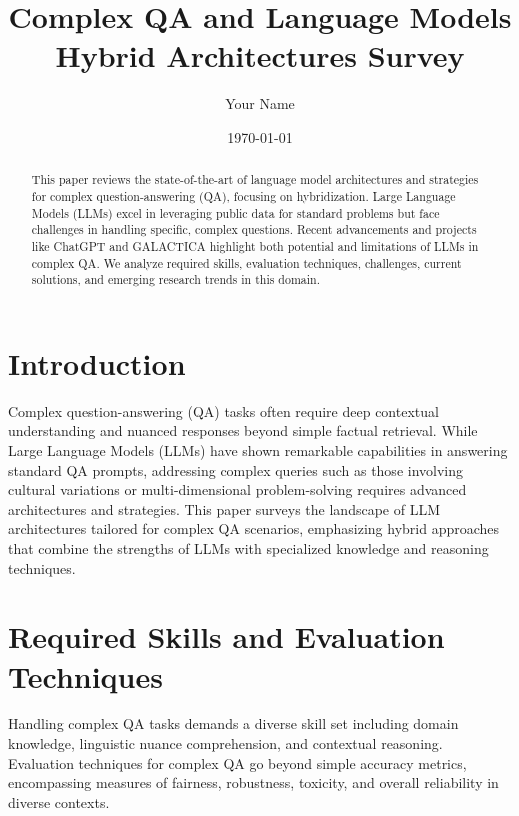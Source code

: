 \documentclass{article}
\title{Complex QA and Language Models Hybrid Architectures Survey}
\author{Your Name}
\date{\today}
\begin{document}
\maketitle

\begin{abstract}
    This paper reviews the state-of-the-art of language model architectures and strategies for complex question-answering (QA), focusing on hybridization. Large Language Models (LLMs) excel in leveraging public data for standard problems but face challenges in handling specific, complex questions. Recent advancements and projects like ChatGPT and GALACTICA highlight both potential and limitations of LLMs in complex QA. We analyze required skills, evaluation techniques, challenges, current solutions, and emerging research trends in this domain.
\end{abstract}

\section{Introduction}
Complex question-answering (QA) tasks often require deep contextual understanding and nuanced responses beyond simple factual retrieval. While Large Language Models (LLMs) have shown remarkable capabilities in answering standard QA prompts, addressing complex queries such as those involving cultural variations or multi-dimensional problem-solving requires advanced architectures and strategies. This paper surveys the landscape of LLM architectures tailored for complex QA scenarios, emphasizing hybrid approaches that combine the strengths of LLMs with specialized knowledge and reasoning techniques.

\section{Required Skills and Evaluation Techniques}
Handling complex QA tasks demands a diverse skill set including domain knowledge, linguistic nuance comprehension, and contextual reasoning. Evaluation techniques for complex QA go beyond simple accuracy metrics, encompassing measures of fairness, robustness, toxicity, and overall reliability in diverse contexts.
\end{document}
